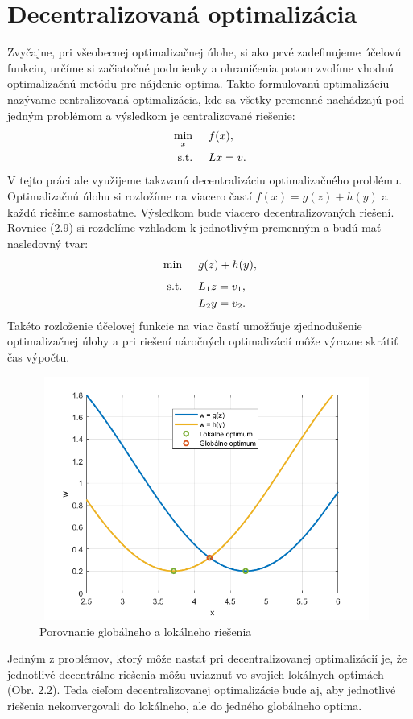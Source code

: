 \section{Decentralizovaná optimalizácia}
\label{se:DecentralizovanaOptimalizacia}
Zvyčajne, pri všeobecnej optimalizačnej úlohe, si ako prvé zadefinujeme účelovú funkciu, určíme si začiatočné podmienky a ohraničenia potom zvolíme vhodnú optimalizačnú metódu pre nájdenie optima. Takto formulovanú optimalizáciu nazývame centralizovaná optimalizácia, kde sa všetky premenné nachádzajú pod jedným problémom a výsledkom je centralizované riešenie:
\begin{subequations}
	\begin{align}
		\displaystyle \min_{x} \hspace{0.5cm} & 
		f(x),\\
		\textrm{s.t.} \hspace{0.5cm} & Lx = v.
	\end{align}
\end{subequations}
V tejto práci ale využijeme takzvanú decentralizáciu optimalizačného problému. Optimalizačnú úlohu si rozložíme na viacero častí $ f(x) = g(z) + h(y)$ a každú riešime samostatne. Výsledkom bude viacero decentralizovaných riešení. Rovnice (2.9) si rozdelíme vzhľadom k jednotlivým premenným a budú mať nasledovný tvar:
\begin{subequations}
	\begin{align}
		\displaystyle \min_{} \hspace{0.5cm} & 
		g(z) + h(y),\\
		\textrm{s.t.} \hspace{0.5cm} & L_{1}z = v_1,\\
		& L_{2}y = v_2.
	\end{align}
\end{subequations}
Takéto rozloženie účelovej funkcie na viac častí umožňuje zjednodušenie optimalizačnej úlohy a pri riešení náročných optimalizácií môže výrazne skrátiť čas výpočtu.
\begin{figure}[H]
	\centering
	\includegraphics[width=11cm,height=8cm]{images/Global_Local_ADM}
	\caption{Porovnanie globálneho a lokálneho riešenia}
\end{figure}
Jedným z problémov, ktorý môže nastať pri decentralizovanej optimalizácií je, že jednotlivé decentrálne riešenia môžu uviaznuť vo svojich lokálnych optimách (Obr. 2.2). Teda cieľom decentralizovanej optimalizácie bude aj, aby jednotlivé riešenia nekonvergovali do lokálneho, ale do jedného globálneho optima. 
